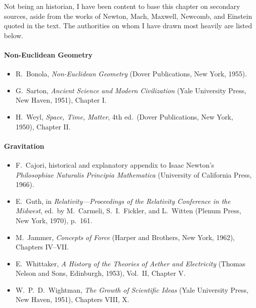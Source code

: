 

Not being an historian, I have been content to base this chapter on secondary
sources, aside from the works of Newton, Mach, Maxwell, Newcomb, and Einstein
quoted in the text. The authorities on whom I have drawn most heavily are
listed below.

\paragraph{Non-Euclidean Geometry}
\begin{itemize}
\renewcommand{\labelitemi}{\(\square\)}
  \item R.\ Bonola, \emph{Non-Euclidean Geometry} (Dover Publications, New
  York, 1955).
  \item G.\ Sarton, \emph{Ancient Science and Modern Civilization} (Yale
  University Press, New Haven, 1951), Chapter I.
  \item H.\ Weyl, \emph{Space, Time, Matter}, 4th ed.\ (Dover Publications,
  New York, 1950), Chapter II.
\end{itemize}

\paragraph{Gravitation}
\begin{itemize}
\renewcommand{\labelitemi}{\(\square\)}
  \item F.\ Cajori, historical and explanatory appendix to Isaac Newton's
  \emph{Philosophiae Naturalis Principia Mathematica} (University of
  California Press, 1966).
  \item E.\ Guth, in \emph{Relativity---Proceedings of the Relativity
  Conference in the Midwest}, ed.\ by M.\ Carmeli, S.\ I.\ Fickler, and
  L.\ Witten (Plenum Press, New York, 1970), p.\ 161.
  \item M.\ Jammer, \emph{Concepts of Force} (Harper and Brothers, New York,
  1962), Chapters IV--VII.
  \item E.\ Whittaker, \emph{A History of the Theories of Aether and
  Electricity} (Thomas Nelson and Sons, Edinburgh, 1953), Vol.\ II, Chapter V.
  \item W.\ P.\ D.\ Wightman, \emph{The Growth of Scientific Ideas} (Yale
  University Press, New Haven, 1951), Chapters VIII, X.
\end{itemize}

